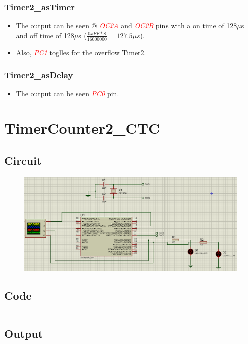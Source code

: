 \documentclass[oneside]{book}
\newcommand{\pinFormat}[1]{\emph{\textcolor{red}{#1}}}
\begin{document}
\subsubsection{Timer2\_asTimer}
\begin{itemize}
    \item The output can be seen @ \pinFormat{OC2A} and \pinFormat{OC2B} pins with a on time of 128$\mu$s and off time of 128$\mu$s ($\frac{0xFF * 8}{16000000} = 127.5\mu s$).
    \item Also, \pinFormat{PC1} toglles for the overflow Timer2.
\end{itemize}
\subsubsection{Timer2\_asDelay}
\begin{itemize}
    \item The output can be seen \pinFormat{PC0} pin.
\end{itemize}


\section{TimerCounter2\_CTC}
\subsection{Circuit}
\begin{figure}[H]
    \centering
    \includegraphics[height=0.2\textheight]{TimerCounter2_CTC.png}
\end{figure}
\subsection{Code}
\inputminted[breaklines, bgcolor=black]{c}{../programFiles/TimerCounter2_CTC.c}
\subsection{Output}
\end{document}
